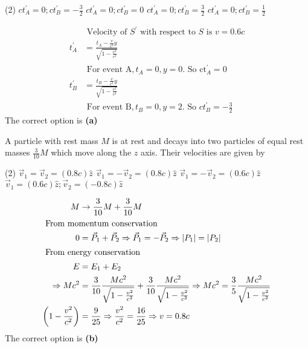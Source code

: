 \begin{enumerate}
\begin{minipage}{\textwidth}
\end{minipage}
\begin{tasks}(2)
	\task[\textbf{A.}] $c t_{A}^{\prime}=0 ; c t_{B}^{\prime}=-\frac{3}{2}$
	\task[\textbf{B.}]$c t_{A}^{\prime}=0 ; c t_{B}^{\prime}=0$
	\task[\textbf{C.}]$c t_{A}^{\prime}=0 ; c t_{B}^{\prime}=\frac{3}{2}$
	\task[\textbf{D.}] $c t_{A}^{\prime}=0 ; c t_{B}^{\prime}=\frac{1}{2}$
\end{tasks}
\begin{answer}
\begin{align*}
&\text { Velocity of } S^{\prime} \text { with respect to } S \text { is } v=0.6 c\\
t_{A}^{\prime}&=\frac{t_{A}-\frac{v}{c^{2}} y}{\sqrt{1-\frac{v^{2}}{c^{2}}}}\\
&\text { For event } \mathrm{A}, t_{A}=0, y=0 \text {. So } \mathrm{ct}_{A}^{\prime}=0\\
t_{B}^{\prime}&=\frac{t_{B}-\frac{v}{c^{2}} y}{\sqrt{1-\frac{v^{2}}{c^{2}}}}\\
&\text { For event } \mathrm{B}, t_{B}=0, y=2 \text {. So } c t_{B}^{\prime}=-\frac{3}{2}
\end{align*}
The correct option is \textbf{(a)}
\end{answer}
\begin{minipage}{\textwidth}
	\item A particle with rest mass $M$ is at rest and decays into two particles of equal rest masses $\frac{3}{10} M$ which move along the $z$ axis. Their velocities are given by
\end{minipage}
\begin{tasks}(2)
	\task[\textbf{A.}] $\vec{v}_{1}=\vec{v}_{2}=(0.8 c) \hat{z}$
	\task[\textbf{B.}]$\vec{v}_{1}=-\vec{v}_{2}=(0.8 c) \hat{z}$
	\task[\textbf{C.}]$\vec{v}_{1}=-\vec{v}_{2}=(0.6 c) \hat{z}$
	\task[\textbf{D.}]$\vec{v}_{1}=(0.6 c) \hat{z} ; \vec{v}_{2}=(-0.8 c) \hat{z}$
\end{tasks}
\begin{answer}
	\begin{align*}
	M &\rightarrow \frac{3}{10} M+\frac{3}{10} M\\
	\intertext { From momentum conservation }
	0&=\vec{P}_{1}+\vec{P}_{2} \Rightarrow \vec{P}_{1}=-\vec{P}_{2} \Rightarrow\left|P_{1}\right|=\left|P_{2}\right|\\
	\intertext { From energy conservation }
	E&=E_{1}+E_{2}\\
	\Rightarrow M c^{2}&=\frac{3}{10} \frac{M c^{2}}{\sqrt{1-\frac{v^{2}}{c^{2}}}}+\frac{3}{10} \frac{M c^{2}}{\sqrt{1-\frac{v^{2}}{c^{2}}}} \Rightarrow M c^{2}=\frac{3}{5} \frac{M c^{2}}{\sqrt{1-\frac{v^{2}}{c^{2}}}}\\
	\left(1-\frac{v^{2}}{c^{2}}\right)&=\frac{9}{25} \Rightarrow \frac{v^{2}}{c^{2}}=\frac{16}{25} \Rightarrow v=0.8 c
	\end{align*}
	The correct option is \textbf{(b)}
\end{answer}
\end{enumerate}